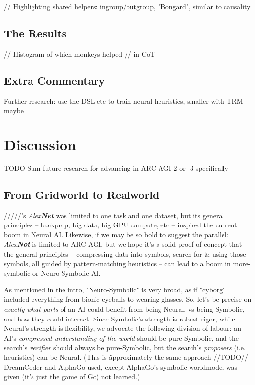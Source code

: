 \documentclass{article}
\begin{document}
// Highlighting shared helpers: ingroup/outgroup, "Bongard", similar to causality

\subsection{The Results}

// Histogram of which monkeys helped // in CoT

\subsection{Extra Commentary}

Further research: use the DSL etc to train neural heuristics, smaller with TRM maybe

\section{Discussion }

TODO Sum future research for advancing in ARC-AGI-2 or -3 specifically

\subsection{From Gridworld to Realworld}

/////'s \textit{Alex\textbf{Net}} was limited to one task and one dataset, but its general principles -- backprop, big data, big GPU compute, etc -- inspired the current boom in Neural AI. Likewise, if we may be so bold to suggest the parallel: \textit{Alex\textbf{Not}} is limited to ARC-AGI, but we hope it's a solid proof of concept that the general principles -- compressing data into symbols, search for \& using those symbols, all guided by pattern-matching heuristics -- can lead to a boom in more-symbolic or Neuro-Symbolic AI.

As mentioned in the intro, "Neuro-Symbolic" is very broad, as if "cyborg" included everything from bionic eyeballs to wearing glasses. So, let's be precise on \textit{exactly what parts} of an AI could benefit from being Neural, vs being Symbolic, and how they could interact. Since Symbolic's strength is robust rigor, while Neural's strength is flexibility, we advocate the following division of labour: an AI's \textit{compressed understanding of the world} should be pure-Symbolic, and the search's \textit{verifier} should always be pure-Symbolic, but the search's \textit{proposers} (i.e. heuristics) can be Neural. (This is \~approximately the same approach //TODO// DreamCoder and AlphaGo used, except AlphaGo's symbolic worldmodel was given (it's just the game of Go) not learned.)
\end{document}
